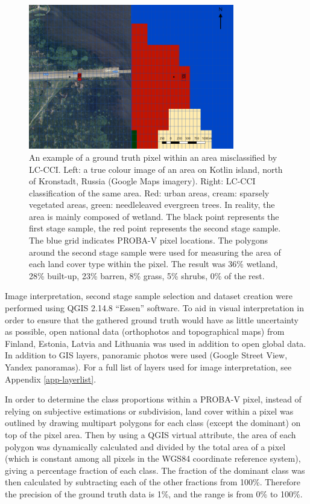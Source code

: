 \documentclass[a4paper,12pt]{scrbook}
\begin{document}
\begin{figure}
 \centering
 \includegraphics[width=0.8\textwidth]{./thesis-figures/classification-example.png}
 \caption{An example of a ground truth pixel within an area misclassified by LC-CCI. Left: a true colour image of an area on Kotlin island, north of Kronstadt, Russia (Google Maps imagery). Right: LC-CCI classification of the same area. Red: urban areas, cream: sparsely vegetated areas, green: needleleaved evergreen trees. In reality, the area is mainly composed of wetland. The black point represents the first stage sample, the red point represents the second stage sample. The blue grid indicates PROBA-V pixel locations. The polygons around the second stage sample were used for measuring the area of each land cover type within the pixel. The result was 36\% wetland, 28\% built-up, 23\% barren, 8\% grass, 5\% shrubs, 0\% of the rest.}
 \label{fig-sampling}
\end{figure}

Image interpretation, second stage sample selection and dataset creation were performed using QGIS 2.14.8 ``Essen'' software. To aid in visual interpretation in order to ensure that the gathered ground truth would have as little uncertainty as possible, open national data (orthophotos and topographical maps) from Finland, Estonia, Latvia and Lithuania was used in addition to open global data. In addition to GIS layers, panoramic photos were used (Google Street View, Yandex panoramas). For a full list of layers used for image interpretation, see Appendix \ref{app-layerlist}.

In order to determine the class proportions within a PROBA-V pixel, instead of relying on subjective estimations or subdivision, land cover within a pixel was outlined by drawing multipart polygons for each class (except the dominant) on top of the pixel area. Then by using a QGIS virtual attribute, the area of each polygon was dynamically calculated and divided by the total area of a pixel (which is constant among all pixels in the WGS84 coordinate reference system), giving a percentage fraction of each class. The fraction of the dominant class was then calculated by subtracting each of the other fractions from 100\%. Therefore the precision of the ground truth data is 1\%, and the range is from 0\% to 100\%.
\end{document}
